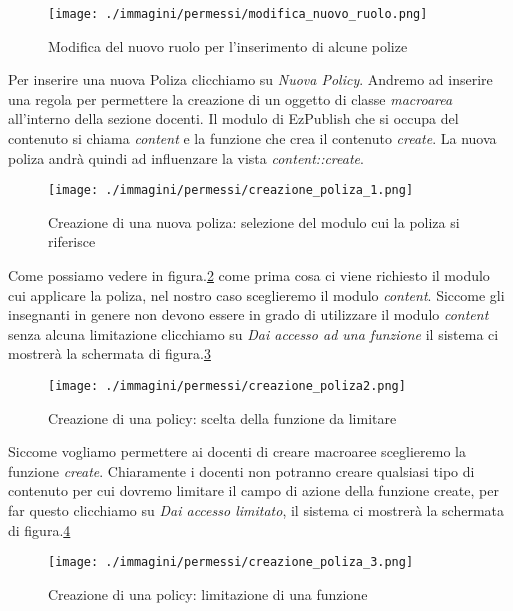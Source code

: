 \begin{figure}[H]
 \centering
 \texttt{[image: ./immagini/permessi/modifica\_nuovo\_ruolo.png]}
 \caption{Modifica del nuovo ruolo per l'inserimento di alcune polize}
 \label{fig:perm_ins_pol}
\end{figure}


Per inserire una nuova Poliza clicchiamo su \textsl{Nuova Policy}. Andremo ad inserire una regola per permettere la creazione di un oggetto di classe \emph{macroarea} all'interno della sezione docenti. Il modulo di EzPublish che si occupa del contenuto si chiama \textsl{content} e la funzione che crea il contenuto \textsl{create}. La nuova poliza andrà quindi ad influenzare la vista \textsl{content::create}.

\begin{figure}[H]
 \centering
 \texttt{[image: ./immagini/permessi/creazione\_poliza\_1.png]}
 \caption{Creazione di una nuova poliza: selezione del modulo cui la poliza si riferisce}
 \label{fig:perm_pol1}
\end{figure}

Come possiamo vedere in figura.\ref{fig:perm_pol1} come prima cosa ci viene richiesto il modulo cui applicare la poliza, nel nostro caso sceglieremo il modulo \textsl{content}. Siccome gli insegnanti in genere non devono essere in grado di utilizzare il modulo \textsl{content} senza alcuna limitazione clicchiamo su \textsl{Dai accesso ad una funzione} il sistema ci mostrerà la schermata di figura.\ref{fig:perm_pol2}

\begin{figure}[H]
 \centering
 \texttt{[image: ./immagini/permessi/creazione\_poliza2.png]}
 \caption{Creazione di una policy: scelta della funzione da limitare}
 \label{fig:perm_pol2}
\end{figure}

Siccome vogliamo permettere ai docenti di creare macroaree sceglieremo la funzione \textsl{create}. Chiaramente i docenti non potranno creare qualsiasi tipo di contenuto per cui dovremo limitare il campo di azione della funzione create, per far questo clicchiamo su \textsl{Dai accesso limitato}, il sistema ci mostrerà la schermata di figura.\ref{fig:perm_pol3}

\begin{figure}
 \centering
 \texttt{[image: ./immagini/permessi/creazione\_poliza\_3.png]}
 \caption{Creazione di una policy: limitazione di una funzione}
 \label{fig:perm_pol3}
\end{figure}

